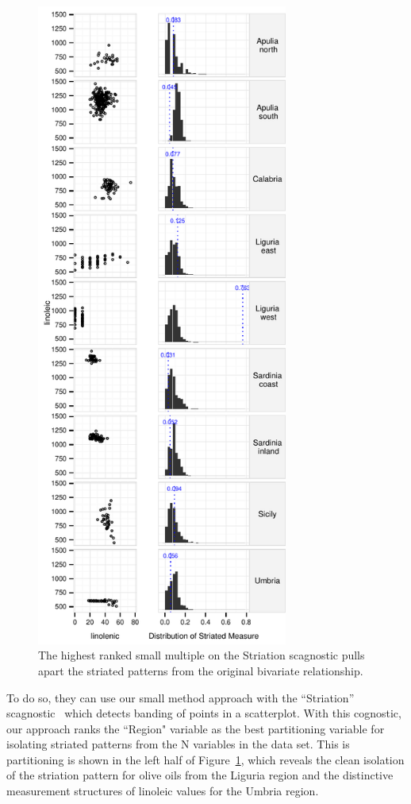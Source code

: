 \begin{figure}
	\includegraphics[width=3.25in]{images/15_729035813077-region.pdf}
	  \caption{The highest ranked small multiple on the Striation scagnostic pulls apart the striated patterns from the original bivariate relationship. }
	 \label{fig:vrich_sm}
\end{figure}

To do so, they can use our small method approach with the ``Striation'' scagnostic~\cite{Wilkinson2005} which detects banding of points in a scatterplot. With this cognostic, our approach ranks the ``Region" variable as the best partitioning variable for isolating striated patterns from the N variables in the data set. This is partitioning is shown in the left half of Figure~\ref{fig:vrich_sm}, which reveals the clean isolation of the striation pattern for olive oils from the Liguria region and the distinctive measurement structures of linoleic values for the Umbria region.

